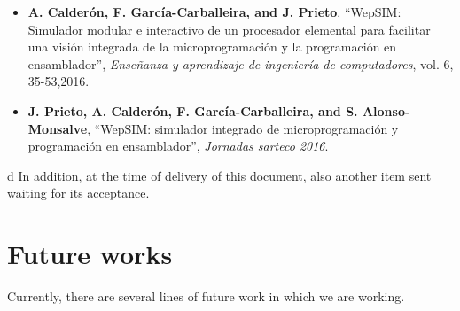 \begin{itemize}

\item \textbf{A. Calderón, F. García-Carballeira, and J. Prieto}, “WepSIM: Simulador modular e interactivo de un procesador elemental para facilitar una visión integrada de la microprogramación y la programación en ensamblador”, \textit{Enseñanza y aprendizaje de ingeniería de computadores}, vol. 6, 35-53,2016. \cite{mateos2016wepsim}

\item \textbf{J. Prieto, A. Calderón, F. García-Carballeira, and S. Alonso-Monsalve}, “WepSIM: simulador integrado de microprogramación y programación en ensamblador”, \textit{Jornadas sarteco 2016}. \cite{arcos2032}

\end{itemize}
d
In addition, at the time of delivery of this document, also another item sent waiting for its acceptance.

\vspace{1cm}

\section{Future works}

Currently, there are several lines of future work in which we are working.

